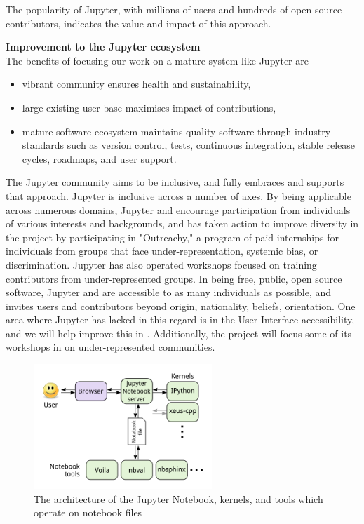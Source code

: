 The popularity of Jupyter, with millions of users and hundreds of open
source contributors, indicates the value and impact of this approach.

\medskip
\noindent\textbf{Improvement to the Jupyter ecosystem}\\
The benefits of focusing our work on a mature system like Jupyter are
\begin{itemize}
\item vibrant community ensures health and sustainability,
\item large existing user base maximises impact of contributions,
\item mature software ecosystem maintains quality software through
  industry standards such as version control, tests, continuous
  integration, stable release cycles, roadmaps, and user support.
\end{itemize}

The Jupyter community aims to be inclusive, and \TheProject fully
embraces and supports that approach.  Jupyter is inclusive across a number of axes.
By being applicable across numerous domains, Jupyter and \TheProject
encourage participation from individuals of various interests and
backgrounds, and has taken action to improve diversity in the project
by participating in "Outreachy," a program of paid internships for
individuals from groups that face under-representation, systemic bias,
or discrimination.  Jupyter has also operated workshops focused on
training contributors from under-represented groups.  In being free,
public, open source software, Jupyter and \TheProject are accessible
to as many individuals as possible, and invites users and contributors
beyond origin, nationality, beliefs, orientation.  One area where
Jupyter has lacked in this regard is in the User Interface
accessibility, and we will help improve this in
.  Additionally, the project will
focus some of its workshops in  on
under-represented communities.


\begin{figure}[ht!]\centering
  \includegraphics[width=0.6\textwidth]{images/notebook_components.png}
  \caption{The architecture of the Jupyter Notebook, kernels, and tools
        which operate on notebook files}
  \label{fig:notebook-architecture}
\end{figure}

